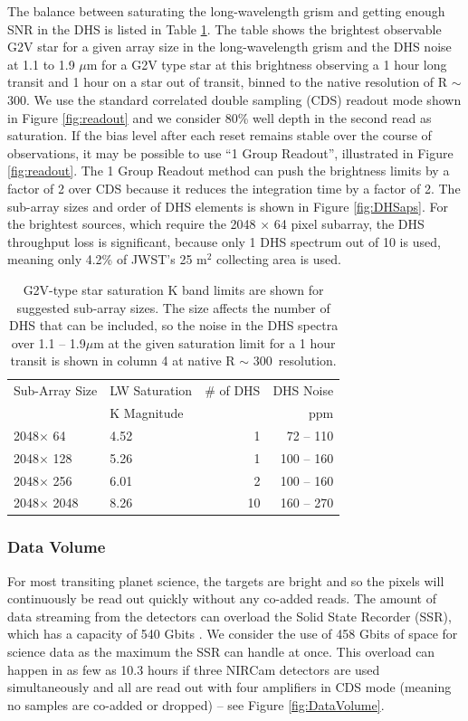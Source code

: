 \documentclass[iop]{emulateapj}
\newcommand{\DHSresApprox}{300}
\begin{document}
The balance between saturating the long-wavelength grism and getting enough SNR in the DHS is listed in Table \ref{tab:SatSNRsubA}.
The table shows the brightest observable G2V star  for a given array size in the long-wavelength grism and the DHS noise at 1.1 to 1.9 $\mu$m for a G2V type star at this brightness observing a 1 hour long transit and 1 hour on a star out of transit, binned to the native resolution of R $\sim$ \DHSresApprox.
We use the standard correlated double sampling (CDS) readout mode shown in Figure \ref{fig:readout} and we consider 80\% well depth in the second read as saturation.
If the bias level after each reset remains stable over the course of observations, it may be possible to use ``1 Group Readout'', illustrated in Figure \ref{fig:readout}.
The 1 Group Readout method can push the brightness limits by a factor of 2 over CDS because it reduces the integration time by a factor of 2.
The sub-array sizes and order of DHS elements is shown in Figure \ref{fig:DHSaps}.
For the brightest sources, which require the 2048 $\times$ 64 pixel subarray, the DHS throughput loss is significant, because only 1 DHS spectrum out of 10 is used, meaning only 4.2\% of JWST's 25 m$^2$ collecting area is used.

\begin{table}[!hb]
\centering
\begin{tabular}{llrr}
\hline \hline
Sub-Array Size &  LW Saturation & \# of DHS & DHS Noise\\
               &  K Magnitude   &           & ppm \\
\hline \hline
2048$\times$ 64 & 4.52 & 1 &  72 -- 110 \\
2048$\times$ 128 & 5.26 & 1 &  100 -- 160 \\
2048$\times$ 256 & 6.01 & 2 &  100 -- 160 \\
2048$\times$ 2048 & 8.26 & 10 & 160 -- 270 \\
\hline
\end{tabular}
\caption{G2V-type star saturation K band limits are shown for suggested sub-array sizes.
The size affects the number of DHS that can be included, so the noise in the DHS spectra over 1.1 -- 1.9$\mu$m at the given saturation limit for a 1 hour transit is shown in column 4 at native R $\sim$ \DHSresApprox\ resolution.}\label{tab:SatSNRsubA}
\end{table}


\subsubsection{Data Volume}
For most transiting planet science, the targets are bright and so the pixels will continuously be read out quickly without any co-added reads.
The amount of data streaming from the detectors can overload the Solid State Recorder (SSR), which has a capacity of 540 Gbits \citep{johns2008L2comm}.
We consider the use of 458 Gbits of space for science data as the maximum the SSR can handle at once.
This overload can happen in as few as 10.3 hours if three NIRCam detectors are used simultaneously and all are read out with four amplifiers in CDS mode (meaning no samples are co-added or dropped) -- see Figure \ref{fig:DataVolume}.
\end{document}
